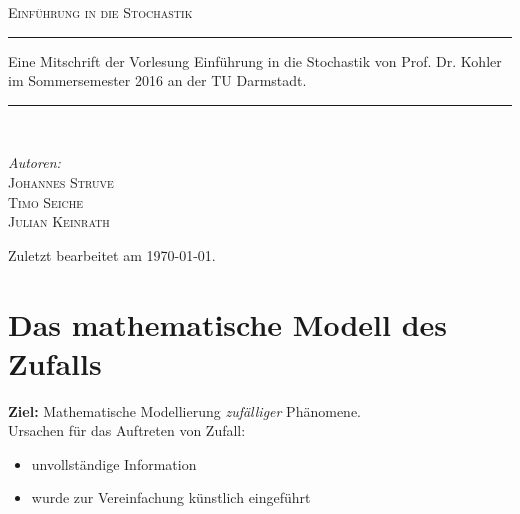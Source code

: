\documentclass[a4paper,12pt,fleqn]{scrartcl}
\theoremstyle{definition}
\theoremstyle{plain}
\theoremstyle{remark}
\begin{document}
\setcounter{section}{3}
\begin{titlepage}
\begin{center}
\textsc{\LARGE Einführung in die Stochastik}\\[2.0cm]
\rule{\linewidth}{0.5mm}
Eine Mitschrift der Vorlesung Einführung in die Stochastik von Prof. Dr. Kohler im Sommersemester 2016 an der TU Darmstadt.
\rule{\linewidth}{0.5mm}\\[2.0cm]
\begin{minipage}{0.4\textwidth}
\begin{flushleft}
\large \emph{Autoren:}\\\textsc{Johannes Struve\\Timo Seiche\\Julian Keinrath}\\[1.0cm]
\end{flushleft}
\end{minipage}
\vfill
Zuletzt bearbeitet am {\large \today}.
\end{center}
\end{titlepage}

\tableofcontents

\newpage

\section{Das mathematische Modell des Zufalls}
\textbf{Ziel:} Mathematische Modellierung \emph{zufälliger} Phänomene.\\
Ursachen für das Auftreten von Zufall:
\begin{itemize}
\item unvollständige Information
\item wurde zur Vereinfachung künstlich eingeführt
\end{itemize}
\end{document}
